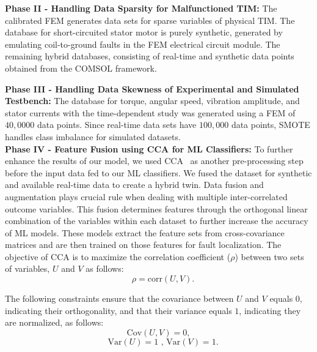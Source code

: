 \documentclass[a4paper,conference]{IEEEtran}
\begin{document}
\textbf{Phase II - Handling Data Sparsity for Malfunctioned TIM:}
The calibrated FEM generates data sets for sparse variables of physical TIM. The database for short-circuited stator motor is purely synthetic, generated by emulating coil-to-ground faults in the FEM electrical circuit module. The remaining hybrid databases, consisting of real-time and synthetic data points obtained from the COMSOL framework.

\textbf{Phase III - Handling Data Skewness of Experimental and Simulated Testbench:}
The database for torque, angular speed, vibration amplitude, and stator currents with the time-dependent study was generated using a FEM of $40,0000$ data points. Since real-time data sets have $100,000$ data points, SMOTE handles class imbalance for simulated datasets.\\
\indent\textbf{Phase IV - Feature Fusion using CCA for ML Classifiers:} To further enhance the results of our model, we used CCA~\cite{yang2019survey} as another pre-processing step before the input data fed to our ML classifiers. We fused the dataset for synthetic and available real-time data to create a hybrid twin. Data fusion and augmentation plays crucial rule when dealing with multiple inter-correlated outcome variables. This fusion determines features through the orthogonal linear combination of the variables within each dataset to further increase the accuracy of ML models. These models extract the feature sets from cross-covariance matrices and are then trained on those features for fault localization. The objective of CCA is to maximize the correlation coefficient ($\rho$) between two sets of variables, $U$ and $V$ as follows:
\begin{equation}
\quad \rho = \text{corr}(U, V).
\label{eq: 1}
\end{equation}

The following constraints ensure that the covariance between $U$ and $V$ equals $0$, indicating their orthogonality, and that their variance equals $1$, indicating they are normalized, as follows:
\begin{equation}
\text{Cov}(U, V) = 0,
\label{eq: 4}
\end{equation}
\begin{equation}
\quad \text{Var}(U) = 1 \text{ , } \text{Var}(V) = 1.
\label{eq: 2}
\end{equation}
\end{document}
